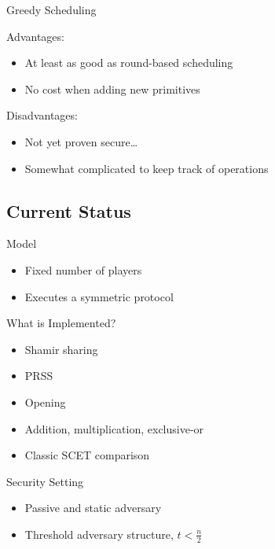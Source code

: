 \documentclass[t,noamsthm]{beamer}
\begin{document}
\begin{frame}{Greedy Scheduling}

  Advantages:
  \begin{itemize}
  \item At least as good as round-based scheduling
  \item No cost when adding new primitives
  \end{itemize}

  Disadvantages:
  \begin{itemize}
  \item Not yet proven secure\dots
  \item Somewhat complicated to keep track of operations
  \end{itemize}

\end{frame}





\subsection{Current Status}

\begin{frame}{Model}

  \begin{itemize}
  \item Fixed number of players
  \item Executes a symmetric protocol
  \end{itemize}

\end{frame}

\begin{frame}{What is Implemented?}

  \begin{itemize}
  \item Shamir sharing
  \item PRSS
  \item Opening
  \item Addition, multiplication, exclusive-or
  \item Classic SCET comparison
  \end{itemize}

\end{frame}

\begin{frame}{Security Setting}

  \begin{itemize}
  \item Passive and static adversary
  \item Threshold adversary structure, $t < \frac n 2$
  \end{itemize}

\end{frame}
\end{document}
